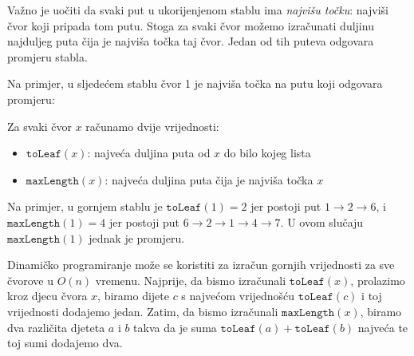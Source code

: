 Važno je uočiti da svaki put
u ukorijenjenom stablu ima \emph{najvišu točku}:
najviši čvor koji pripada tom putu.
Stoga za svaki čvor možemo izračunati duljinu
najduljeg puta čija je najviša točka taj čvor.
Jedan od tih puteva odgovara promjeru stabla.

Na primjer, u sljedećem stablu
čvor 1 je najviša točka na putu
koji odgovara promjeru:
\begin{center}
\end{center}

Za svaki čvor $x$ računamo dvije vrijednosti:
\begin{itemize}
\item $\texttt{toLeaf}(x)$: najveća duljina puta od $x$ do bilo kojeg lista
\item $\texttt{maxLength}(x)$: najveća duljina puta
čija je najviša točka $x$
\end{itemize}
Na primjer, u gornjem stablu je
$\texttt{toLeaf}(1)=2$ jer postoji put
$1 \rightarrow 2 \rightarrow 6$,
i $\texttt{maxLength}(1)=4$
jer postoji put
$6 \rightarrow 2 \rightarrow 1 \rightarrow 4 \rightarrow 7$.
U ovom slučaju $\texttt{maxLength}(1)$ jednak je promjeru.

Dinamičko programiranje može se koristiti za izračun gornjih
vrijednosti za sve čvorove u $O(n)$ vremenu.
Najprije, da bismo izračunali $\texttt{toLeaf}(x)$,
prolazimo kroz djecu čvora $x$,
biramo dijete $c$ s najvećom vrijednošću $\texttt{toLeaf}(c)$
i toj vrijednosti dodajemo jedan.
Zatim, da bismo izračunali $\texttt{maxLength}(x)$,
biramo dva različita djeteta $a$ i $b$
takva da je suma $\texttt{toLeaf}(a)+\texttt{toLeaf}(b)$
najveća te toj sumi dodajemo dva.

